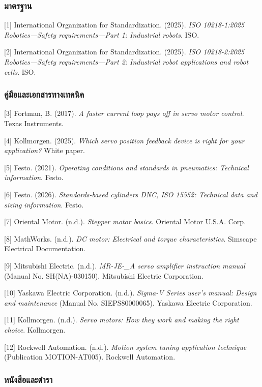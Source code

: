 \subsubsection{มาตรฐาน}

[1] International Organization for Standardization. (2025). \textit{ISO 10218-1:2025 Robotics—Safety requirements—Part 1: Industrial robots}. ISO.

[2] International Organization for Standardization. (2025). \textit{ISO 10218-2:2025 Robotics—Safety requirements—Part 2: Industrial robot applications and robot cells}. ISO.

\subsubsection{คู่มือและเอกสารทางเทคนิค}

[3] Fortman, B. (2017). \textit{A faster current loop pays off in servo motor control}. Texas Instruments.

[4] Kollmorgen. (2025). \textit{Which servo position feedback device is right for your application?} White paper.

[5] Festo. (2021). \textit{Operating conditions and standards in pneumatics: Technical information}. Festo.

[6] Festo. (2026). \textit{Standards-based cylinders DNC, ISO 15552: Technical data and sizing information}. Festo.

[7] Oriental Motor. (n.d.). \textit{Stepper motor basics}. Oriental Motor U.S.A. Corp.

[8] MathWorks. (n.d.). \textit{DC motor: Electrical and torque characteristics}. Simscape Electrical Documentation.

[9] Mitsubishi Electric. (n.d.). \textit{MR-JE-\_A servo amplifier instruction manual} (Manual No. SH(NA)-030150). Mitsubishi Electric Corporation.

[10] Yaskawa Electric Corporation. (n.d.). \textit{Sigma-V Series user’s manual: Design and maintenance} (Manual No. SIEPS80000065). Yaskawa Electric Corporation.

[11] Kollmorgen. (n.d.). \textit{Servo motors: How they work and making the right choice}. Kollmorgen.

[12] Rockwell Automation. (n.d.). \textit{Motion system tuning application technique} (Publication MOTION-AT005). Rockwell Automation.

\subsubsection{หนังสือและตำรา}

